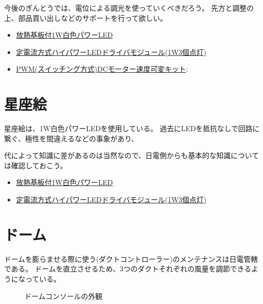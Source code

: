 \documentclass[letterpaper,10pt,dvipdfmx]{sphinxmanual}
\begin{document}
今後のぎんとうでは、電位による調光を使っていくべきだろう。
先方と調整の上、部品買い出しなどのサポートを行って欲しい。

\begin{itemize}
\item {} 
\href{http://akizukidenshi.com/catalog/g/gI-03709/}{放熱基板付1W白色パワーLED}

\item {} 
\href{http://akizukidenshi.com/catalog/g/gM-04488/}{定電流方式ハイパワーLEDドライバモジュール(1W3個点灯)}

\item {} 
\href{http://akizukidenshi.com/catalog/g/gK-06244/}{PWM(スイッチング方式)DCモーター速度可変キット}:

\end{itemize}


\section{星座絵}
\label{\detokenize{syutou:id6}}
星座絵は、1W白色パワーLEDを使用している。
過去にLEDを抵抗なしで回路に繋ぐ、極性を間違えるなどの事象があり、

代によって知識に差があるのは当然なので、日電側からも基本的な知識については確認しておこう。

\begin{itemize}
\item {} 
\href{http://akizukidenshi.com/catalog/g/gI-03709/}{放熱基板付1W白色パワーLED}

\item {} 
\href{http://akizukidenshi.com/catalog/g/gM-04488/}{定電流方式ハイパワーLEDドライバモジュール(1W3個点灯)}

\end{itemize}


\section{ドーム}
\label{\detokenize{syutou:id7}}
ドームを膨らませる際に使う(ダクトコントローラー)のメンテナンスは日電管轄である。
ドームを直立させるため、3つのダクトそれぞれの風量を調節できるようになっている。
\begin{figure}[htbp]
\centering
\capstart

\noindent{}
\caption{ドームコンソールの外観}\label{\detokenize{syutou:id11}}\end{figure}
\end{document}

